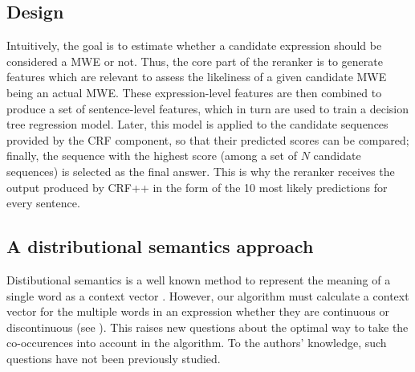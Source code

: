 \documentclass[output=paper
,modfonts
,nonflat]{langsci/langscibook}
\begin{document}
\subsection{Design}

Intuitively, the goal is to estimate whether a candidate expression
should be considered a MWE or not. Thus, the core part of the reranker
is to generate features which are relevant to assess the likeliness of
a given candidate MWE being an actual MWE. These expression-level
features are then combined to produce a set of sentence-level
features, which in turn are used to train a decision tree regression
model. Later, this model is applied to the candidate sequences
provided by the CRF component, so that their predicted scores can be
compared; finally, the sequence with the highest score (among a set of
$N$ candidate sequences) is selected as the final answer. This is why
the reranker receives the output produced by CRF++ in the form of the
10 most likely predictions for every sentence.




\subsection{A distributional semantics approach}
\label{subsec:semanticsApproach}


Distibutional semantics is a well known method to represent the
meaning of a single word as a context vector
\citep{schutze1998}. However, our algorithm must calculate a context
vector for the multiple words in an expression whether they are
continuous or discontinuous (see ).  This
raises new questions about the optimal way to take the co-occurences into
 account in the algorithm. To the authors’ knowledge, such
questions have not been previously studied.
\end{document}
